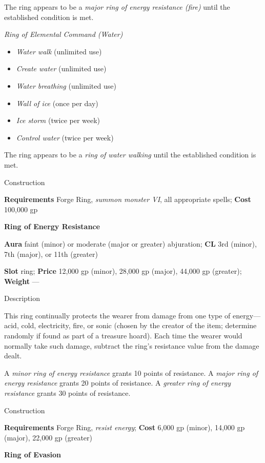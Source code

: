 The ring appears to be a \textit{major ring of energy resistance (fire) }until the established condition is met.
				
\textit{Ring of Elemental Command (Water)}
				\begin{itemize}\item  \textit{Water walk }(unlimited use)
				\item  \textit{Create water }(unlimited use)
				\item  \textit{Water breathing }(unlimited use)
				\item  \textit{Wall of ice }(once per day)
				\item  \textit{Ice storm }(twice per week)
				\item  \textit{Control water} (twice per week)
\end{itemize}
				
The ring appears to be a \textit{ring of water walking }until the established condition is met. 
				
Construction
				
\textbf{Requirements} Forge Ring, \textit{summon monster VI}, all appropriate spells; \textbf{Cost }100,000 gp
				
\textbf{Ring of Energy Resistance}
				
\textbf{Aura} faint (minor) or moderate (major or greater) abjuration;\textbf{ CL }3rd (minor), 7th (major), or 11th (greater)
				
\textbf{Slot} ring; \textbf{Price} 12,000 gp (minor), 28,000 gp (major), 44,000 gp (greater); \textbf{Weight} ---
				
Description
				
This ring continually protects the wearer from damage from one type of energy---acid, cold, electricity, fire, or sonic (chosen by the creator of the item; determine randomly if found as part of a treasure hoard). Each time the wearer would normally take such damage, subtract the ring's resistance value from the damage dealt.
				
A \textit{minor ring of energy resistance} grants 10 points of resistance. A \textit{major ring of energy resistance} grants 20 points of resistance. A \textit{greater ring of energy resistance} grants 30 points of resistance. 
				
Construction
				
\textbf{Requirements} Forge Ring, \textit{resist energy}; \textbf{Cost }6,000 gp (minor), 14,000 gp (major), 22,000 gp (greater)
				
\textbf{Ring of Evasion}
				
